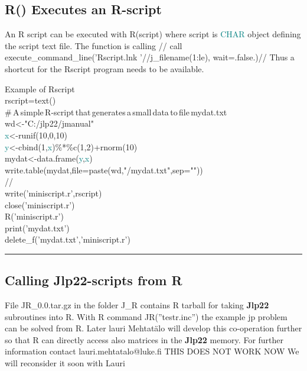 \subsection{ \textcolor{VioletRed}{R}() Executes an R-script} 
\label{R} 
An R script can be executed with \textcolor{VioletRed}{R}(script) where script is \textcolor{teal}{CHAR} object 
defining the script text file. The function is calling // 
call execute\_command\_line('Rscript.lnk '//j\_filename(1:le), wait=.false.)// 
Thus a shortcut for the Rscript program needs to be available. 
\singlespacing 
\begin{example}[Rex]Example of Rscript\\ 
\label{Rex} 
\noindent rscript=\textcolor{VioletRed}{text}()\\ 
\#\,A\,simple\,R-script\,that\,generates\,a\,small\,data\,to\,file\,mydat.txt\\ 
wd<-"C:/jlp22/jmanual"\\ 
\textcolor{teal}{x}<-runif(10,0,10)\\ 
\textcolor{teal}{y}<-cbind(1,\textcolor{teal}{x})\%*\%c(1,2)+rnorm(10)\\ 
mydat<-data.frame(\textcolor{teal}{y},\textcolor{teal}{x})\\ 
write.\textcolor{VioletRed}{table}(mydat,file=paste(wd,"/mydat.txt",sep=""))\\ 
//                                                                          \\ 
\textcolor{VioletRed}{write}('miniscript.r',rscript)\\ 
\textcolor{VioletRed}{close}('miniscript.r')\\ 
\textcolor{VioletRed}{R}('miniscript.r')\\ 
\textcolor{VioletRed}{print}('mydat.txt')\\ 
\textcolor{VioletRed}{delete\_f}('mydat.txt','miniscript.r')\\ 
\end{example} 
\vspace{-7mm} \rule{5cm}{0.1pt} 
\onehalfspacing 
\subsection{Calling \textbf{Jlp22}-scripts from R} 
\label{Rcalls} 
File JR\_0.0.tar.gz in the folder J\_R contains R tarball for taking \textbf{Jlp22}  subroutines into R. 
With R command JR(”testr.inc”) the example jp problem can be solved from R. 
Later lauri Mehtat\"alo will develop this co-operation further so that R can directly access also 
matrices in the \textbf{Jlp22} memory. 
For further information contact lauri.mehtatalo@luke.fi 
THIS DOES NOT WORK NOW We will reconsider it soon with Lauri 
